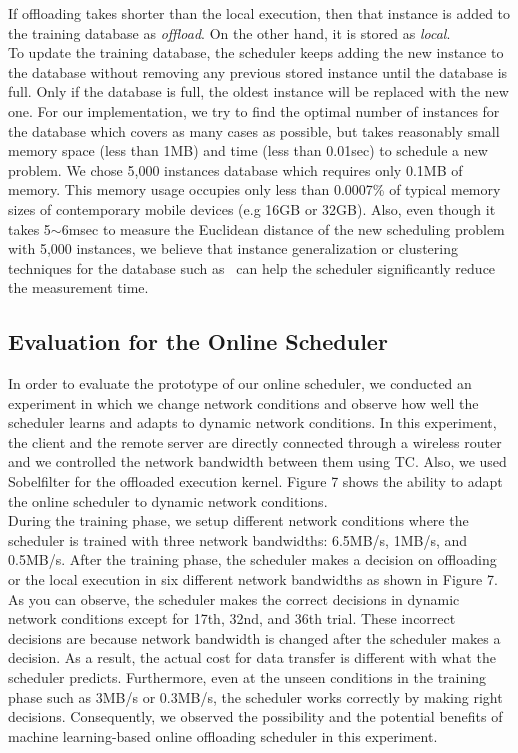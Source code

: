 \documentclass[10pt, conference, compsocconf]{IEEEtran}
\begin{document}
%
If offloading takes shorter than the local execution, then that instance
is added to the training database as \textit{offload}.
%
On the other hand, it is stored as \textit{local}.\\
%
%
\indent To update the training database, the scheduler keeps adding the
new instance to the database without removing any previous stored
instance until the database is full.
%
Only if the database is full, the oldest instance will be replaced with
the new one.
%
For our implementation, we try to find the optimal number of instances for
the database which covers as many cases as possible, but takes reasonably small 
memory space (less than 1MB) and time (less than 0.01sec) to schedule a
new problem.
%
We chose 5,000 instances database which requires only 0.1MB of memory.
%
This memory usage occupies only less than 0.0007\% of typical memory
sizes of
contemporary mobile devices (e.g 16GB or 32GB).
%
Also, even though it takes 5$\sim$6msec to measure the Euclidean
distance of the new scheduling problem with 5,000
instances, we believe that instance generalization or clustering techniques for
the database such as~\cite{domingos, chang} can help the
scheduler significantly reduce the measurement time. 
%
\subsection{Evaluation for the Online Scheduler}
In order to evaluate the prototype of our online scheduler, we conducted
an experiment in which we change network conditions and observe how
well the scheduler learns and adapts to dynamic network conditions.
%
In this experiment, the client and the remote server are directly
connected through a wireless router and we controlled the network
bandwidth between them using TC.
%
Also, we used Sobelfilter for the offloaded execution kernel.
%
Figure 7 shows the ability to adapt the online scheduler to dynamic
network conditions.\\
%
\indent During the training phase, we setup different network conditions where
the scheduler is trained with three network bandwidths: 6.5MB/s, 1MB/s,
and 0.5MB/s.
%
After the training phase, the scheduler makes a decision on offloading
or the local execution in six different network bandwidths as shown in
Figure 7.
%
As you can observe, the scheduler makes the correct decisions in dynamic
network conditions except for 17th, 32nd, and 36th trial.
%
These incorrect decisions are because network bandwidth is changed
after the scheduler makes a decision.
%
As a result, the actual cost for data transfer is different with what
the scheduler predicts. 
%
Furthermore, even at the unseen conditions in the training phase such as
3MB/s or 0.3MB/s, the scheduler works correctly by making right
decisions.
%
Consequently, we observed the possibility and the potential benefits of
machine learning-based online offloading scheduler in this experiment. 
% 
\end{document}
